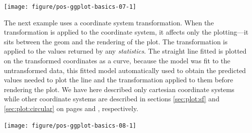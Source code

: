\documentclass[krantz2]{krantz}\usepackage{knitr}%
\begin{document}
\begin{knitrout}\footnotesize
{}\color{fgcolor}\begin{kframe}
\begin{alltt}
\hlstd{(} 
       \hlstd{(}    \hlopt{+}
  \hlstd{()} \hlopt{+}
  \hlstd{(} \hlstd{=} \hlstd{,}  \hlstd{=} \hlstd{)} \hlopt{+}
  \hlstd{(} \hlstd{=} \hlstd{(}\hlstd{,} \hlstd{))}
\end{alltt}
\end{kframe}

{\centering \texttt{[image: figure/pos-ggplot-basics-07-1]} 

}



\end{knitrout}

The next example uses a coordinate system transformation. When the transformation is applied to the coordinate system, it affects only the plotting---it sits between the geom and the rendering of the plot. The transformation is applied to the values returned by any \emph{statistics}. The straight line fitted is plotted on the transformed coordinates as a curve, because the model was fit to the untransformed data, this fitted model automatically used to obtain the predicted values needed to plot the line and the transformation applied to them before rendering the plot. We have here described only cartesian coordinate systems while other coordinate systems are described in sections \ref{sec:plot:sf} and \ref{sec:plot:circular} on pages \pageref{sec:plot:sf} and \pageref{sec:plot:circular}, respectively.

\begin{knitrout}\footnotesize
{}\color{fgcolor}\begin{kframe}
\begin{alltt}
\hlstd{(} 
       \hlstd{(}    \hlopt{+}
  \hlstd{()} \hlopt{+}
  \hlstd{(} \hlstd{=} \hlstd{,}  \hlstd{=} \hlstd{)} \hlopt{+}
  \hlstd{(} \hlstd{=} \hlstd{)}
\end{alltt}
\end{kframe}

{\centering \texttt{[image: figure/pos-ggplot-basics-08-1]} 

}



\end{knitrout}
\end{document}
